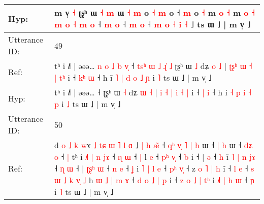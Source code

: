 \documentclass[10pt]{article}
\DeclareRobustCommand{\hl}[1]{{\textcolor{red}{#1}}}
\begin{document}
\begin{longtable}{ll}
 \\
Hyp: & m v̩ \hl{˧} ʈʂʰ ɯ\hl{}\hl{}\hl{}\hl{}\hl{}\hl{}\hl{}\hl{}\hl{}\hl{}\hl{} \hl{˧} \hl{m} ɯ\hl{}\hl{} \hl{˧} \hl{m} o \hl{˧} \hl{}\hl{m} o ˧ \hl{m} o\hl{}\hl{}\hl{}\hl{}\hl{}\hl{}\hl{}\hl{}\hl{} \hl{˧} m\hl{}\hl{}\hl{}\hl{}\hl{} \hl{o} \hl{˧} m\hl{}\hl{}\hl{}\hl{}\hl{}\hl{}\hl{} \hl{o} \hl{˧} \hl{m} \hl{o} \hl{˧} \hl{m} \hl{}\hl{o} ˧\hl{}\hl{}\hl{} \hl{}\hl{m} \hl{o} ˧ \hl{}\hl{m} \hl{o} ˧ \hl{}\hl{m} \hl{o} \hl{˧} \hl{i} \hl{˧} ˩ ts ɯ ˩ | m v̩ ˩
 \\
\midrule
Utterance ID: & 49 \\
Ref: & tʰ i ˩˥ | əəə…\hl{ }\hl{n}\hl{ }\hl{o}\hl{ }\hl{˩}\hl{ }\hl{b}\hl{ }\hl{v}\hl{̩} ˧\hl{ }\hl{t}\hl{s}\hl{ʰ}\hl{ }\hl{ɯ}\hl{ }\hl{˩}\hl{ }\hl{ɻ}\hl{̍}\hl{ }\hl{˩} ʈʂʰ ɯ \hl{˩} dʑ \hl{o} \hl{˩} | \hl{ʈ}\hl{ʂ}\hl{ʰ} \hl{ɯ} \hl{˧} \hl{|} \hl{t}\hl{ʰ} i ˧ \hl{k}\hl{ʰ} \hl{ɯ} ˧ h i\hl{̃}\hl{ }\hl{˥} \hl{|} \hl{d} \hl{o} \hl{˩} \hl{ɲ} i \hl{˥} ts ɯ ˩ | m v̩ ˩
 \\
Hyp: & tʰ i ˩˥ | əəə…\hl{}\hl{}\hl{}\hl{}\hl{}\hl{}\hl{}\hl{}\hl{}\hl{}\hl{} ˧\hl{}\hl{}\hl{}\hl{}\hl{}\hl{}\hl{}\hl{}\hl{}\hl{}\hl{}\hl{}\hl{} ʈʂʰ ɯ \hl{˧} dʑ \hl{ɯ} \hl{˧} | \hl{i}\hl{ }\hl{˧} \hl{|} \hl{i} \hl{˧} \hl{}\hl{|} i ˧ \hl{}\hl{|} \hl{i} ˧ h i\hl{}\hl{}\hl{} \hl{˧} \hl{p} \hl{i} \hl{˧} \hl{p} i \hl{˩} ts ɯ ˩ | m v̩ ˩
 \\
\midrule
Utterance ID: & 50 \\
Ref: & d\hl{ }\hl{o}\hl{ }\hl{˩}\hl{ }\hl{k} \hl{w}ɤ\hl{ }\hl{˩}\hl{ }\hl{t}\hl{ɕ}\hl{ }\hl{ɯ}\hl{ }\hl{˥}\hl{ }\hl{l}\hl{ }\hl{ɑ} ˩\hl{ }\hl{|} \hl{h} \hl{æ}\hl{̃} ˧\hl{ }\hl{q}\hl{ʰ}\hl{ }\hl{v}\hl{̩}\hl{ }\hl{˥} \hl{|}\hl{ }\hl{h} ɯ ˧ \hl{|}\hl{ }\hl{h} ɯ ˧ \hl{d}\hl{ʑ} \hl{o} ˧\hl{ }\hl{|} tʰ i \hl{˩}\hl{˥} \hl{|}\hl{ }\hl{n} \hl{j}\hl{ɤ} ˧ \hl{ɳ} \hl{ɯ} ˧\hl{ }\hl{|} l \hl{e} ˧ \hl{p}\hl{ʰ} \hl{v}\hl{̩} ˧ \hl{}\hl{b} i ˧ | \hl{ə} ˧ \hl{}\hl{h} i\hl{̃} \hl{˥} \hl{|}\hl{ }\hl{n} \hl{j}\hl{ɤ} ˧ \hl{}\hl{ɳ} \hl{ɯ} ˧ |\hl{ }\hl{ʈ}\hl{ʂ}\hl{ʰ} \hl{ɯ} ˧ \hl{n} \hl{e} ˧ \hl{ʝ} i\hl{ }\hl{˥} \hl{|} \hl{l} \hl{e} ˧ \hl{p}\hl{ʰ} \hl{v}\hl{̩} ˧ z\hl{ }\hl{o} \hl{˥} \hl{|} \hl{h} i\hl{̃} ˧ \hl{l} \hl{e} ˧ \hl{s} \hl{ɯ} \hl{˩} \hl{k} \hl{v}\hl{̩} \hl{˩} h\hl{ }\hl{ɯ}\hl{ }\hl{˩}\hl{ }\hl{|}\hl{ }\hl{m} \hl{ɤ} ˧\hl{ }\hl{d} \hl{o} \hl{˩} \hl{|} \hl{p} i ˧ \hl{z} \hl{o} \hl{˩} \hl{|} \hl{t}\hl{ʰ} i \hl{˩}\hl{˥} \hl{|} \hl{h} \hl{ɯ} ˧\hl{ }\hl{ɲ} i\hl{ }\hl{˥} ts ɯ ˩ | m v̩ ˩
 \\

\end{longtable}
\end{document}
